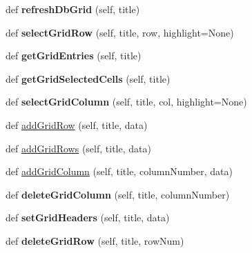 \begin{DoxyCompactItemize}
def {\bfseries refresh\+Db\+Grid} (self, title)
\item 
\mbox{\label{class_python_01_g_u_i_1_1appjar_1_1gui_afe5e4004dbd2d129fd9b4ed249b94028}} 
def {\bfseries select\+Grid\+Row} (self, title, row, highlight=None)
\item 
\mbox{\label{class_python_01_g_u_i_1_1appjar_1_1gui_a6a3e08fe16ce803a3be182b6697bc9ad}} 
def {\bfseries get\+Grid\+Entries} (self, title)
\item 
\mbox{\label{class_python_01_g_u_i_1_1appjar_1_1gui_ae8f46b4dedecd53f3669dfd0c92d0219}} 
def {\bfseries get\+Grid\+Selected\+Cells} (self, title)
\item 
\mbox{\label{class_python_01_g_u_i_1_1appjar_1_1gui_a1b86bdc47403be413d4eb458c84aa47c}} 
def {\bfseries select\+Grid\+Column} (self, title, col, highlight=None)
\item 
def \hyperlink{class_python_01_g_u_i_1_1appjar_1_1gui_a441374ce26eb6c2efb743a75a39ea3c4}{add\+Grid\+Row} (self, title, data)
\item 
def \hyperlink{class_python_01_g_u_i_1_1appjar_1_1gui_ab5dd21fc5cee948f8107f77cc712d3c8}{add\+Grid\+Rows} (self, title, data)
\item 
def \hyperlink{class_python_01_g_u_i_1_1appjar_1_1gui_a2d19adfd9698c71d2d9816f8253f7d2f}{add\+Grid\+Column} (self, title, column\+Number, data)
\item 
\mbox{\label{class_python_01_g_u_i_1_1appjar_1_1gui_a0c68eea5bf1db755c4ef62e192114adf}} 
def {\bfseries delete\+Grid\+Column} (self, title, column\+Number)
\item 
\mbox{\label{class_python_01_g_u_i_1_1appjar_1_1gui_a6f62b15e8561f9388175169e71428363}} 
def {\bfseries set\+Grid\+Headers} (self, title, data)
\item 
\mbox{\label{class_python_01_g_u_i_1_1appjar_1_1gui_ad7892e231b3da5b24506cdb9af80b6da}} 
def {\bfseries delete\+Grid\+Row} (self, title, row\+Num)
\item 

\end{DoxyCompactItemize}
